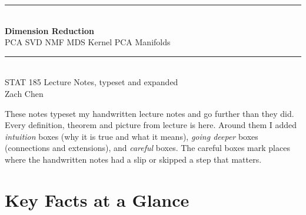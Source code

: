 \documentclass[11pt]{article}
\newcommand{\bm}[1]{\symbfit{#1}}
\newcommand{\vw}{\bm{w}}
\begin{document}
\begin{titlepage}
\centering
\vspace*{3.2cm}
{\color{defblue}\rule{0.75\linewidth}{1pt}}\\[1.2em]
{\Huge\bfseries Dimension Reduction}\\[0.6em]
{\Large PCA \textperiodcentered{} SVD \textperiodcentered{} NMF \textperiodcentered{} MDS \textperiodcentered{} Kernel PCA \textperiodcentered{} Manifolds}\\[1.2em]
{\color{defblue}\rule{0.75\linewidth}{1pt}}\\[2.2em]
{\large STAT 185 \textemdash{} Lecture Notes, typeset and expanded}\\[0.5em]
{\normalsize Zach Chen}\\[3em]

\begin{minipage}{0.78\linewidth}
\small
These notes typeset my handwritten lecture notes and go further than they did.
Every definition, theorem and picture from lecture is here. Around them I added
\emph{intuition} boxes (why it is true and what it means), \emph{going deeper} boxes
(connections and extensions), and \emph{careful} boxes. The careful boxes mark
places where the handwritten notes had a slip or skipped a step that matters.
\end{minipage}

\vfill
{}
\end{titlepage}

\tableofcontents
\newpage

\section*{Key Facts at a Glance}
\end{document}
